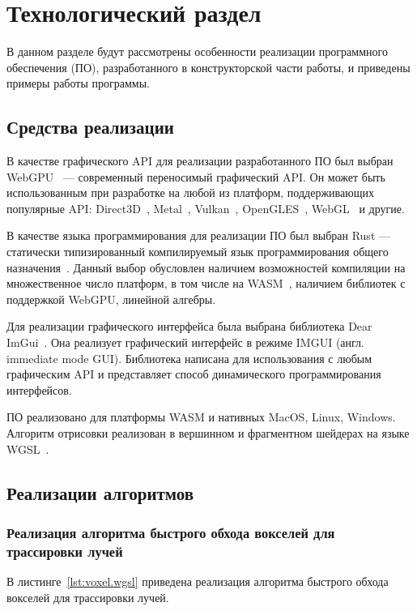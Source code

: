 \chapter{Технологический раздел}

В данном разделе будут рассмотрены особенности реализации программного обеспечения (ПО),
разработанного в конструкторской части работы, и приведены примеры работы программы.

\section{Средства реализации}

В качестве графического API для реализации разработанного ПО 
был выбран WebGPU~\cite{WebGPU} --- современный переносимый графический
API.
Он может быть использованным при разработке на любой из платформ, 
поддерживающих популярные API: Direct3D~\cite{DirectX12}, 
Metal~\cite{Metal}, Vulkan~\cite{Vulkan}, OpenGLES~\cite{OpenGLES}, WebGL~\cite{WebGL} и другие.

В качестве языка программирования для реализации ПО был выбран Rust --- 
статически типизированный компилируемый язык программирования общего назначения~\cite{Rust}.
Данный выбор обусловлен наличием возможностей 
компиляции на множественное число платформ, в том числе на WASM~\cite{WASM}, наличием
библиотек с поддержкой WebGPU, линейной алгебры.

Для реализации графического интерфейса была выбрана библиотека Dear ImGui~\cite{ImGui}.
Она реализует графический интерфейс в режиме IMGUI (англ. immediate mode GUI). Библиотека написана 
для использования с любым графическим API и представляет способ динамического 
программирования интерфейсов.

ПО реализовано для платформы WASM и нативных MacOS, Linux, Windows. 
Алгоритм отрисовки реализован в вершинном и фрагментном шейдерах на языке WGSL~\cite{WebGPUSL}.

\section{Реализации алгоритмов}

\subsection{Реализация алгоритма быстрого обхода вокселей для трассировки лучей}

В листинге~\ref{lst:voxel.wgsl} приведена реализация алгоритма быстрого 
обхода вокселей для трассировки лучей.

